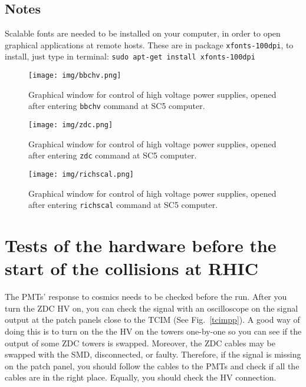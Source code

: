 \subsection{Notes}
Scalable fonts are needed to be installed on your computer, in order to open graphical applications at remote hosts.
These are in package \texttt{xfonts-100dpi}, to install, just type in terminal: \texttt{sudo apt-get install xfonts-100dpi}
 

\begin{figure}[htb]
  \begin{center}
    \texttt{[image: img/bbchv.png]}
  \end{center}
  \caption{Graphical window for control of high voltage power supplies, opened after entering \texttt{bbchv} command at SC5 computer.}
\label{bbchv}
\end{figure}

\begin{figure}[htb]
  \begin{center}
    \texttt{[image: img/zdc.png]}
  \end{center}
  \caption{Graphical window for control of high voltage power supplies, opened after entering \texttt{zdc} command at SC5 computer.}
\label{zdcwindow}
\end{figure}

\begin{figure}[htb]
  \begin{center}
    \texttt{[image: img/richscal.png]}
  \end{center}
  \caption{Graphical window for control of high voltage power supplies, opened after entering \texttt{richscal} command at SC5 computer.}
\label{richscal}
\end{figure}







\section{Tests of the hardware before the start of the collisions at RHIC}
The PMTs' response to cosmics needs to be checked before the run. After you turn the ZDC HV on, you can check the signal with an oscilloscope on the signal output at the patch panels close to the TCIM (See Fig.\ \ref{tcimpp}). A good way of doing this is to turn on the the HV on the towers one-by-one so you can see if the output of some ZDC towers is swapped.
Moreover, the ZDC cables may be swapped with the SMD, disconnected, or faulty. Therefore, if the signal is missing on the patch panel, you should follow the cables to the PMTs and check if all the cables are in the right place. Equally, you should check the HV connection.

